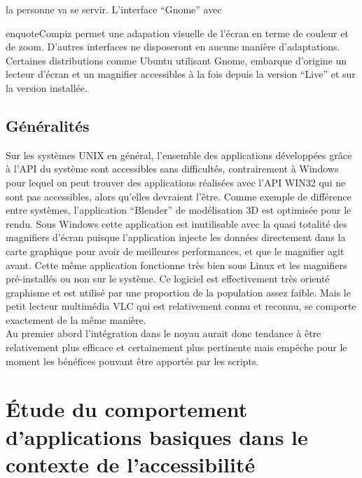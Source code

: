 \documentclass[french,a4paper]{report}
\begin{document}
la personne va se servir. L'interface \enquote{Gnome} avec {enquote{Compiz} permet une adapation
visuelle de l'écran en terme
de couleur et de zoom. D'autres interfaces ne disposeront en aucune manière d'adaptations.
Certaines distributions comme Ubuntu utilisant Gnome, embarque d'origine un lecteur d'écran et
un magnifier accessibles à la fois depuis la version \enquote{Live} et sur la version installée.
\subsection{Généralités}
Sur les systèmes UNIX en général, l'ensemble des applications développées grâce
à l'API du système sont accessibles sans difficultés, contrairement à Windows
pour lequel on peut trouver des applications réalisées avec l'API WIN32 qui ne
sont pas accessibles, alors qu'elles devraient l'être. Comme exemple de
différence entre systèmes, l'application \enquote{Blender} de modélisation 3D
est optimisée pour le rendu. Sous Windows cette application est inutilisable
avec la quasi totalité des magnifiers d'écran puisque l'application injecte les
données directement dans la carte graphique pour avoir de meilleures
performances, et que le magnifier agit avant. Cette même application fonctionne
très bien sous Linux et les magnifiers pré-installés ou non sur le système. Ce
logiciel est effectivement très orienté graphisme et est utilisé par une
proportion de la population assez faible. Mais le petit lecteur multimédia VLC
qui est relativement connu et reconnu, se comporte exactement de la
même manière. \\
Au premier abord l'intégration dans le noyau aurait donc tendance à être relativement plus
efficace et certainement plus pertinente mais empêche pour le moment les bénéfices pouvant
être apportés par les scripts.
\section{Étude du comportement d'applications basiques dans le contexte de l'accessibilité}
}
\end{document}
